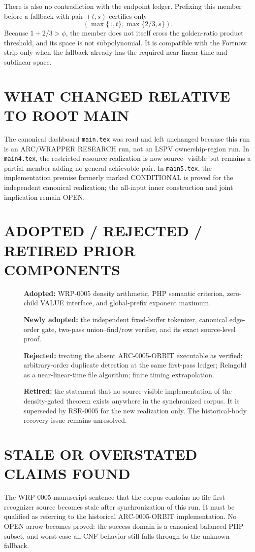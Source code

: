\documentclass[11pt]{article}
\begin{document}
There is also no contradiction with the endpoint ledger.  Prefixing this
member before a fallback with pair $(t,s)$ certifies only
\[
 (\max\{1,t\},\max\{2/3,s\}).
\]
Because $1+2/3>\phi$, the member does not itself cross the golden-ratio
product threshold, and its space is not subpolynomial.  It is compatible with
the Fortnow strip only when the fallback already has the required near-linear
time and sublinear space.

\section{WHAT CHANGED RELATIVE TO ROOT MAIN}
The canonical dashboard \texttt{main.tex} was read and left unchanged because
this run is an ARC/WRAPPER RESEARCH run, not an LSPV ownership-region run.
In \texttt{main4.tex}, the restricted resource realization is now source-
visible but remains a partial member adding no general achievable pair.  In
\texttt{main5.tex}, the implementation premise formerly marked CONDITIONAL is
proved for the independent canonical realization; the all-input inner
construction and joint implication remain OPEN.

\section{ADOPTED / REJECTED / RETIRED PRIOR COMPONENTS}
\begin{description}
\item[] \textbf{Adopted:} WRP-0005 density arithmetic, PHP semantic criterion,
zero-child VALUE interface, and global-prefix exponent maximum.
\item[] \textbf{Newly adopted:} the independent fixed-buffer tokenizer,
canonical edge-order gate, two-pass union--find/row verifier, and its exact
source-level proof.
\item[] \textbf{Rejected:} treating the absent ARC-0005-ORBIT executable as
verified; arbitrary-order duplicate detection at the same first-pass ledger;
Reingold as a near-linear-time file algorithm; finite timing extrapolation.
\item[] \textbf{Retired:} the statement that no source-visible implementation
of the density-gated theorem exists anywhere in the synchronized corpus.  It
is superseded by RSR-0005 for the new realization only.  The historical-body
recovery issue remains unresolved.
\end{description}

\section{STALE OR OVERSTATED CLAIMS FOUND}
The WRP-0005 manuscript sentence that the corpus contains no file-first
recognizer source becomes stale after synchronization of this run.  It must
be qualified as referring to the historical ARC-0005-ORBIT implementation.
No OPEN arrow becomes proved: the success domain is a canonical balanced PHP
subset, and worst-case all-CNF behavior still falls through to the unknown
fallback.
\end{document}
